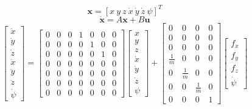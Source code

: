 \documentclass[a4paper, 12pt]{report}
\begin{document}
 \[\boldsymbol{x} =  [x \ y \ z \ \dot x \ \dot y \ \dot z \ \psi]^T \]
\[\boldsymbol{\dot x} =  A \boldsymbol{x} + B \boldsymbol{u} \]
\[\begin{bmatrix}\dot x \\ \dot y \\ \dot z \\ \ddot x \\ \ddot y \\ \ddot z \\ \dot \psi\end{bmatrix}  = 
\begin{bmatrix}  0 & 0 & 0 & 1 & 0 & 0 & 0 \\ 0 & 0 & 0 & 0 & 1 & 0 & 0 \\ 0 & 0 & 0 & 0 & 0 & 1 & 0 \\ 0 & 0 & 0 & 0 & 0 & 0 & 0 \\ 0 & 0 & 0 & 0 & 0 & 0 & 0 \\ 0 & 0 & 0 & 0 & 0 & 0 & 0 \\ 0 & 0 & 0 & 0 & 0 & 0 & 0 \end{bmatrix} 
\begin{bmatrix} x \\ y \\ z \\ \dot x \\ \dot y \\ \dot z \\ \psi \end{bmatrix}  + \begin{bmatrix}  0 & 0 & 0 & 0 \\ 0 & 0 & 0 & 0 \\ 0 & 0 & 0 & 0 \\ \frac{1}{m} & 0 & 0 & 0 \\ 0 & \frac{1}{m} & 0 & 0 \\ 0 & 0 & \frac{1}{m} & 0 \\ 0 & 0 & 0 & 1 \end{bmatrix} \begin{bmatrix} f_x \\ f_y \\ f_z \\ \dot \psi \end{bmatrix} \]
\end{document}
